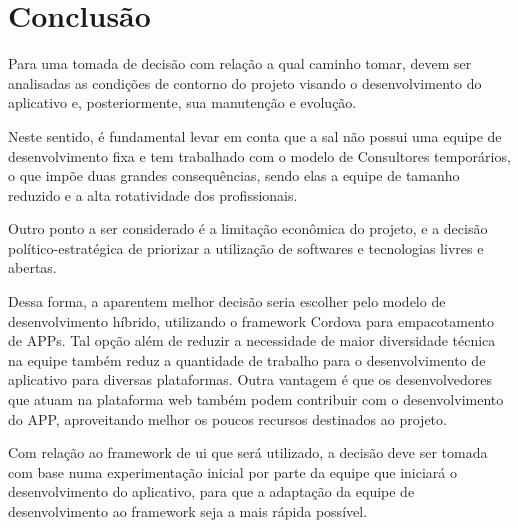 \chapter{Conclusão}
Para uma tomada de decisão com relação a qual caminho tomar, devem ser analisadas as condições de contorno do projeto visando o desenvolvimento do aplicativo e, posteriormente, sua manutenção e evolução. 

Neste sentido, é fundamental levar em conta que a \gls{sal} não possui uma equipe de desenvolvimento fixa e tem trabalhado com o modelo de Consultores temporários, o que impõe duas grandes consequências, sendo elas a equipe de tamanho reduzido e a alta rotatividade dos profissionais.

Outro ponto a ser considerado é a limitação econômica do projeto, e a decisão político-estratégica de priorizar a utilização de softwares e tecnologias livres e abertas.

Dessa forma, a aparentem melhor decisão seria escolher pelo modelo de desenvolvimento híbrido, utilizando o framework Cordova para empacotamento de APPs. Tal opção além de reduzir a necessidade de maior diversidade técnica na equipe também reduz a quantidade de trabalho para o desenvolvimento de aplicativo para diversas plataformas. Outra vantagem é que os desenvolvedores que atuam na plataforma web também podem contribuir com o desenvolvimento do APP, aproveitando melhor os poucos recursos destinados ao projeto.

Com relação ao framework de \gls{ui} que será utilizado, a decisão deve ser tomada com base numa experimentação inicial por parte da equipe que iniciará o desenvolvimento do aplicativo, para que a adaptação da equipe de desenvolvimento ao framework seja a mais rápida possível.
